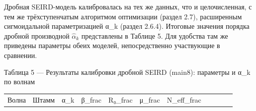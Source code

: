 \documentclass[12pt]{article}
\begin{document}
Дробная SEIRD-модель калибровалась на тех же данных, что и
целочисленная, с тем же трёхступенчатым алгоритмом оптимизации (раздел
2.7), расширенным сигмоидальной параметризацией α\_k (раздел 2.6.4).
Итоговые значения порядка дробной производной \(\hat{\alpha}_k\)
представлены в Таблице 5. Для удобства там же приведены параметры обеих
моделей, непосредственно участвующие в сравнении.

Таблица 5 --- Результаты калибровки дробной SEIRD (main8): параметры и
α\_k по волнам

{\def\LTcaptype{none} %
\begin{longtable}[]{@{}
  >{\centering\arraybackslash}p{}
  >{\raggedright\arraybackslash}p{}
  >{\centering\arraybackslash}p{}
  >{\centering\arraybackslash}p{}
  >{\centering\arraybackslash}p{}
  >{\centering\arraybackslash}p{}
  >{\centering\arraybackslash}p{}
  >{\centering\arraybackslash}p{}
  >{\centering\arraybackslash}p{}
  >{\centering\arraybackslash}p{}
  >{\centering\arraybackslash}p{}@{}}
\toprule\noalign{}
\begin{minipage}[b]{\linewidth}\centering
Волна
\end{minipage} & \begin{minipage}[b]{\linewidth}\raggedright
Штамм
\end{minipage} & \begin{minipage}[b]{\linewidth}\centering
α\_k
\end{minipage} & \begin{minipage}[b]{\linewidth}\centering
β\_frac
\end{minipage} & \begin{minipage}[b]{\linewidth}\centering
R₀\_frac
\end{minipage} & \begin{minipage}[b]{\linewidth}\centering
μ\_frac
\end{minipage} & \begin{minipage}[b]{\linewidth}\centering
N\_eff\_frac
\end{minipage} & \begin{minipage}[b]{\linewidth}\centering

\end{minipage}
\end{longtable}}
\end{document}
